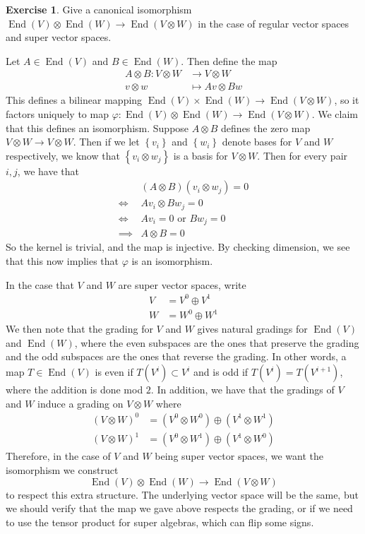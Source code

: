 \documentclass[psamsfonts]{amsart}
\theoremstyle{definition}
\newtheorem{exer}[thm]{Exercise}
\theoremstyle{remark}
\newcommand{\set}[1]{\left\lbrace #1 \right\rbrace}
\DeclareMathOperator{\End}{End}
\begin{document}
%
\begin{exer}
Give a canonical isomorphism $\End(V) \otimes \End(W) \to \End(V \otimes W)$ in the case of regular vector spaces and super vector spaces.
\end{exer}
Let $A \in \End(V)$ and $B \in \End(W)$. Then define the map 
\begin{align*}
A \otimes B : V \otimes W &\to V \otimes W \\
v \otimes w &\mapsto Av \otimes Bw
\end{align*}
This defines a bilinear mapping $\End(V) \times \End(W) \to \End(V \otimes W)$, so it factors uniquely to map $\varphi : \End(V) \otimes \End(W) \to \End(V \otimes W)$. We claim that this defines an isomorphism. Suppose $A \otimes B$ defines the zero map $V \otimes W \to V \otimes W$. Then if we let $\set{v_i}$ and $\set{w_i}$ denote bases for $V$ and $W$ respectively, we know that $\set{v_i \otimes w_j}$ is a basis for $V \otimes W$. Then for every pair $i,j$, we have that 
\begin{align*}
&(A \otimes B)(v_i \otimes w_j) = 0 \\
\iff &Av_i \otimes Bw_j = 0 \\
\iff &Av_i = 0 \text{ or } Bw_j = 0 \\
\implies &A \otimes B = 0
\end{align*}
So the kernel is trivial, and the map is injective. By checking dimension, we see that this now implies that $\varphi$ is an isomorphism.

In the case that $V$ and $W$ are super vector spaces, write
\begin{align*}
V &= V^0 \oplus V^1 \\
W &= W^0 \oplus W^1
\end{align*}
We then note that the grading for $V$ and $W$ gives natural gradings for $\End(V)$ and $\End(W)$, where the even subspaces are the ones that preserve the grading and the odd subspaces are the ones that reverse the grading. In other words, a map $T \in \End(V)$ is even if $T(V^i) \subset V^i$ and is odd if $T(V^i)  = T(V^{i+1})$, where the addition is done mod $2$. In addition, we have that the gradings of $V$ and $W$ induce a grading on $V \otimes W$ where
\begin{align*}
(V \otimes W)^0 &= (V^0 \otimes W^0) \oplus (V^1 \otimes W^1) \\
(V \otimes W)^1 &= (V^0 \otimes W^1) \oplus (V^1 \otimes W^0)
\end{align*}
Therefore, in the case of $V$ and $W$ being super vector spaces, we want the isomorphism we construct 
$$\End(V) \otimes \End(W) \to \End(V \otimes W)$$
to respect this extra structure. The underlying vector space will be the same, but we should verify that the map we gave above respects the grading, or if we need to use the tensor product for super algebras, which can flip some signs.
%
\end{document}
